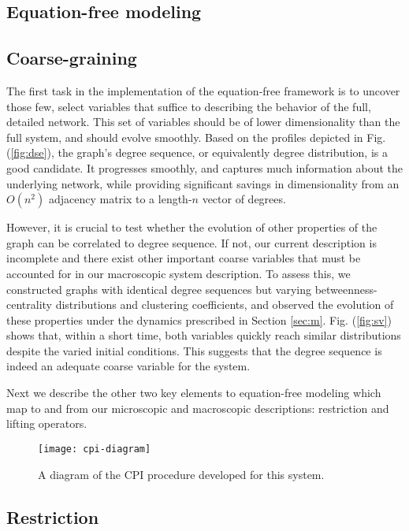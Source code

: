 \documentclass[epjST, final]{svjour}
\begin{document}
\begin{onehalfspace}
\section{Equation-free modeling}
\label{sec:ef}

\subsection{Coarse-graining}

The first task in the implementation of the equation-free framework is to uncover those few, select variables that suffice to describing the behavior of the full, detailed network. This set of variables should be of lower dimensionality than the full system, and should evolve smoothly. Based on the profiles depicted in Fig. (\ref{fig:dse}), the graph's degree sequence, or equivalently degree distribution, is a good candidate. It progresses smoothly, and captures much information about the underlying network, while providing significant savings in dimensionality from an $O(n^2)$ adjacency matrix to a length-$n$ vector of degrees. \par

However, it is crucial to test whether the evolution of other properties of the graph can be correlated to degree sequence. If not, our current description is incomplete and there exist other  important coarse variables that must be accounted for in our macroscopic system description. To assess this, we constructed graphs with identical degree sequences but varying betweenness-centrality distributions and clustering coefficients, and observed the evolution of these properties under the dynamics prescribed in Section \ref{sec:m}. Fig. (\ref{fig:sv}) shows that, within a short time, both variables quickly reach similar distributions despite the varied initial conditions. This suggests that the degree sequence is indeed an adequate coarse variable for the system. \par

Next we describe the other two key elements to equation-free modeling
which map to and from our microscopic and macroscopic descriptions:
restriction and lifting operators.

\begin{figure}[ht!]
  \centering
  \texttt{[image: cpi-diagram]}
  \caption{A diagram of the CPI procedure developed for this system. \label{fig:cpi-diagram}}
\end{figure}


\subsection{Restriction}


\end{onehalfspace}
\end{document}
